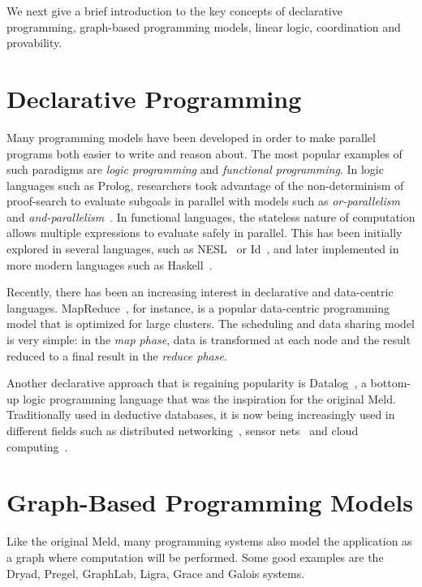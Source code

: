 We next give a brief introduction to the key concepts of declarative programming, graph-based programming models,
linear logic, coordination and provability.

\section{Declarative Programming}

Many programming models have been developed in order to make parallel programs both easier to write and reason about. The most popular examples of such paradigms are \emph{logic programming} and \emph{functional programming}.
In logic languages such as Prolog, researchers took advantage of the non-determinism of proof-search to evaluate subgoals
in parallel with models such as \emph{or-parallelism} and \emph{and-parallelism}~\cite{Gupta:2001:PEP:504083.504085}.
In functional languages, the stateless nature of computation allows multiple expressions to evaluate safely in parallel.
This has been initially explored in several languages, such as NESL~\cite{Blelloch:1996:PPA:227234.227246} or Id~\cite{Nikhil93anoverview}, and later implemented in more modern languages such as Haskell~\cite{Chakravarty07dataparallel}.

Recently, there has been an increasing interest in declarative and data-centric languages.
MapReduce~\cite{Dean:2008:MSD:1327452.1327492}, for instance, is a popular data-centric programming
model that is optimized for large clusters. The scheduling and data sharing model is very simple:
in the \emph{map phase}, data is transformed at each node and the result reduced to a final
result in the \emph{reduce phase}.

Another declarative approach that is regaining popularity is Datalog~\cite{Ullman:1990:PDK:533142}, a
bottom-up logic programming language that was the inspiration for the original Meld.
Traditionally used in deductive databases, it is now being increasingly used in different fields
such as distributed networking~\cite{Loo-condie-garofalakis-p2}, sensor
nets~\cite{Chu:2007:DID:1322263.1322281} and cloud computing~\cite{alvaro:boom}.

\section{Graph-Based Programming Models}

Like the original Meld, many programming systems also model the application as a
graph where computation will be performed.  Some good examples are the Dryad,
Pregel, GraphLab, Ligra, Grace and Galois systems.

